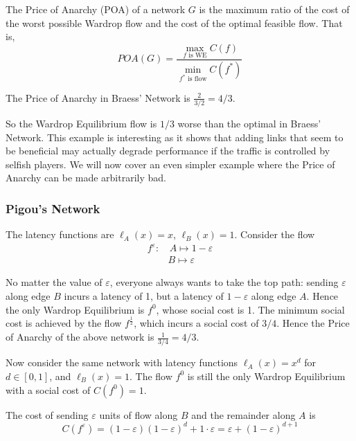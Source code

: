 \begin{definition}
	The Price of Anarchy (POA) of a network $G$ is the maximum ratio of
	the cost of the worst possible Wardrop flow and the cost of the optimal
	feasible flow. That is,
	\begin{equation}
		POA(G) = \frac{ \max_{f \text{ is WE}} C(f) }{ \min_{f^* \text{ is
		flow}} C(f^*) }
	\end{equation}
\end{definition}

\begin{fact}
	The Price of Anarchy in Braess' Network is $\frac{2}{3/2} = 4/3$.
\end{fact}

So the Wardrop Equilibrium flow is $1/3$ worse than the optimal in Braess'
Network. This example is interesting as it shows that adding links that seem to
be beneficial may actually degrade performance if the traffic is controlled by
selfish players. We will now cover an even simpler example where the Price of
Anarchy can be made arbitrarily bad.

\subsubsection{Pigou's Network}

The latency functions are $\ell_A(x)=x$, $\ell_B(x)=1$. Consider the flow
\begin{equation*}
	\begin{split}
		f^\varepsilon : & \, A \mapsto 1 - \varepsilon \\
		& B \mapsto \varepsilon
	\end{split}
\end{equation*}

No matter the value of $\varepsilon$, everyone always wants to take the top
path: sending $\varepsilon$ along edge $B$ incurs a latency of 1, but a latency
of $1-\varepsilon$ along edge $A$. Hence the only Wardrop Equilibrium is $f^0$,
whose social cost is 1. The minimum social cost is achieved by the flow
$f^\frac{1}{2}$, which incurs a social cost of $3/4$. Hence the Price of
Anarchy of the above network is $\frac{1}{3/4} = 4/3$.

Now consider the same network with latency functions $\ell_A(x)=x^d$ for $d \in
[0,1]$, and $\ell_B(x)=1$. The flow $f^0$ is still the only Wardrop Equilibrium
with a social cost of $C(f^0) = 1$.

The cost of sending $\varepsilon$ units of flow along $B$ and the remainder
along $A$ is
$$C(f^\varepsilon) = (1-\varepsilon)(1-\varepsilon)^d + 1 \cdot \varepsilon =
\varepsilon + (1-\varepsilon)^{d+1}$$

